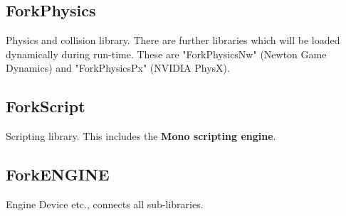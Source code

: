 \documentclass{article}
\begin{document}
\subsection{ForkPhysics}
Physics and collision library.
There are further libraries which will be loaded dynamically during run-time.
These are "ForkPhysicsNw" (Newton Game Dynamics) and "ForkPhysicsPx" (NVIDIA PhysX).

\subsection{ForkScript}
Scripting library. This includes the \textbf{Mono scripting engine}.

\subsection{ForkENGINE}
Engine Device etc., connects all sub-libraries.
\end{document}
